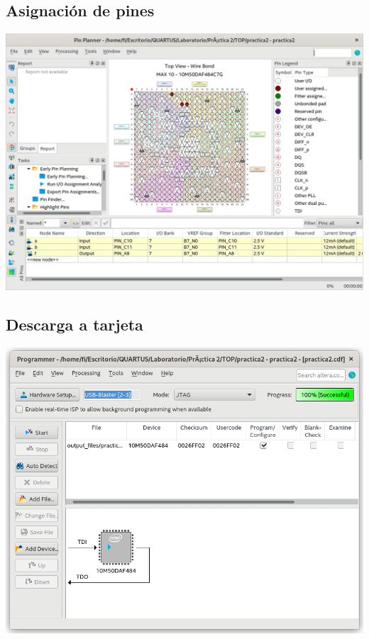 \documentclass[10pt,a4paper]{article}
\begin{document}
	\subsection{Asignación de pines}
	\begin{center}
		\includegraphics[scale=0.35]{Pines.png}
	\end{center}
	
	\subsection{Descarga a tarjeta}
	\begin{center}
		\includegraphics[scale=0.35]{Descarga.png}
	\end{center}
\end{document}
